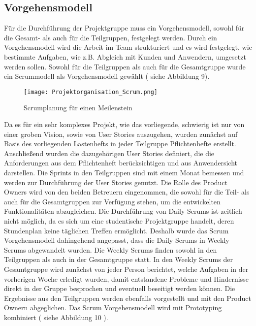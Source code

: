 \subsection{Vorgehensmodell}
Für die Durchführung der Projektgruppe muss ein Vorgehensmodell, sowohl für die Gesamt- als auch für die Teilgruppen, festgelegt werden. Durch ein Vorgehensmodell wird die Arbeit im Team strukturiert und es wird festgelegt, wie bestimmte Aufgaben, wie z.B. Abgleich mit Kunden und Anwendern, umgesetzt werden sollen. Sowohl für die Teilgruppen als auch für die Gesamtgruppe wurde ein Scrummodell als Vorgehensmodell gewählt ( siehe Abbildung 9).

	\begin{figure}[h!]
		\centering
			\texttt{[image: Projektorganisation\_Scrum.png]}
			\caption{Scrumplanung f\"ur einen Meilenstein}
			\label{Projektorganisation_Scrum}
	\end{figure}	

Da es für ein sehr komplexes Projekt, wie das vorliegende, schwierig ist nur von einer groben Vision, sowie von User Stories auszugehen, wurden zun\"achst auf Basis des vorliegenden Lastenhefts in jeder Teilgruppe Pflichtenhefte erstellt. Anschließend wurden die dazugeh\"origen User Stories definiert, die die Anforderungen aus dem Pflichtenheft ber\"ucksichtigen und aus Anwendersicht darstellen. Die Sprints in den Teilgruppen sind mit einem Monat bemessen und werden zur Durchf\"uhrung der User Stories genutzt. Die Rolle des Product Owners wird von den beiden Betreuern eingenommen, die sowohl für die Teil- als auch für die Gesamtgruppen zur Verfügung stehen, um die entwickelten Funktionalit\"aten abzugleichen.
Die Durchf\"uhrung von Daily Scrums ist zeitlich nicht m\"oglich, da es sich um eine studentische Projektgruppe handelt, deren Stundenplan keine t\"aglichen Treffen erm\"oglicht. Deshalb wurde das Scrum Vorgehensmodell dahingehend angepasst, dass die Daily Scrums in Weekly Scrums abgewandelt wurden. Die Weekly Scrums finden sowohl in den Teilgruppen als auch in der Gesamtgruppe statt. In den Weekly Scrums der Gesamtgruppe wird zun\"achst von jeder Person berichtet, welche Aufgaben in der vorherigen Woche erledigt wurden, damit entstandene Probleme und Hindernisse direkt in der Gruppe besprochen und eventuell beseitigt werden k\"onnen. Die Ergebnisse aus den Teilgruppen werden ebenfalls vorgestellt und mit den Product Ownern abgeglichen.
Das Scrum Vorgehensmodell wird mit  Prototyping kombiniert ( siehe Abbildung 10 ).

